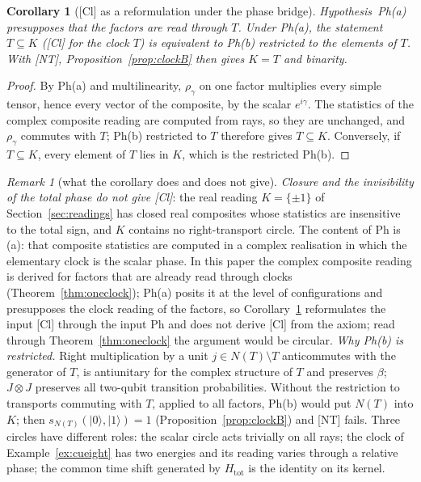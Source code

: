 \documentclass[aps,pra,onecolumn,superscriptaddress,nofootinbib,10pt]{revtex4-2}
\newtheorem{corollary}[theorem]{Corollary}
\theoremstyle{definition}
\theoremstyle{remark}
\newtheorem{remark}[theorem]{Remark}
\begin{document}
\begin{corollary}[{[Cl]} as a reformulation under the phase bridge]\label{cor:clbridge}
Hypothesis~Ph(a) presupposes that the factors are read through $T$.  Under Ph(a), the statement $T\subseteq K$
([Cl] for the clock $T$) is equivalent to Ph(b) restricted to the elements of $T$.  With [NT],
Proposition~\ref{prop:clockB} then gives $K=T$ and binarity.
\end{corollary}
\begin{proof}
By Ph(a) and multilinearity, $\rho_\gamma$ on one factor multiplies every simple tensor, hence every vector of the
composite, by the scalar $e^{i\gamma}$.  The statistics of the complex composite reading are computed from rays, so
they are unchanged, and $\rho_\gamma$ commutes with $T$; Ph(b) restricted to $T$ therefore gives $T\subseteq K$.
Conversely, if $T\subseteq K$, every element of $T$ lies in $K$, which is the restricted Ph(b).
\end{proof}

\begin{remark}[what the corollary does and does not give]\label{rem:clreal}
\emph{Closure and the invisibility of the total phase do not give [Cl]}: the real reading $K=\{\pm1\}$ of
Section~\ref{sec:readings} has closed real composites whose statistics are insensitive to the total sign, and $K$
contains no right-transport circle.  The content of Ph is (a): that composite statistics are computed in
a complex realisation in which the elementary clock is the scalar phase.  In this paper the complex
composite reading is derived for factors that are already read through clocks
(Theorem~\ref{thm:oneclock}); Ph(a) posits it at the level of configurations and presupposes the clock reading of the
factors, so Corollary~\ref{cor:clbridge} reformulates the input [Cl] through the input Ph and does not derive [Cl]
from the axiom; read through Theorem~\ref{thm:oneclock} the argument would be circular.  \emph{Why Ph(b) is restricted.}
Right multiplication by a unit $j\in N(T)\setminus T$ anticommutes with the generator of $T$, is antiunitary for the complex
structure of $T$ and preserves $\beta$; $J\otimes J$ preserves all two-qubit transition probabilities.  Without the
restriction to transports commuting with $T$, applied to all factors, Ph(b) would put $N(T)$ into $K$; then
$s_{N(T)}(\lvert0\rangle,\lvert1\rangle)=1$ (Proposition~\ref{prop:clockB}) and [NT] fails.  Three circles have different roles:
the scalar circle acts trivially on all rays; the clock of Example~\ref{ex:cueight} has two energies and its reading
varies through a relative phase; the common time shift generated by $H_{\mathrm{tot}}$ is the identity on its kernel.
\end{remark}
\end{document}
